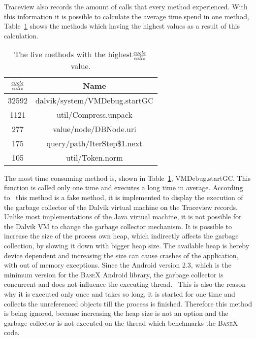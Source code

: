 Traceview also records the amount of calls that every method experienced.
With this information it is possible to calculate the average time spend in one method, Table~\ref{tab:tob-five-cycle-call} shows the methods which having the highest values as a result of this calculation.
\begin{table}[htpb]
	\centering
	\begin{tabular}{|c|c|}
		\hline
		${cycle \over calls}$&Name\\
		\hline
		32592&dalvik/system/VMDebug.startGC\\
		\hline
		1121&util/Compress.unpack\\
		\hline
		277&value/node/DBNode.uri\\
		\hline
		175&query/path/IterStep\$1.next\\
		\hline
		105&util/Token.norm\\
		\hline
	\end{tabular}
	\caption{The five methods with the highest${cycle \over calls}$ value.}
	\label{tab:tob-five-cycle-call}
\end{table}

The most time consuming method is, shown in Table~\ref{tab:tob-five-cycle-call}, \textsf{VMDebug.startGC}.
This function is called only one time and executes a long time in average.
According to~\cite{vmdebug-startgc} this method is a fake method, it is implemented to display the execution of the garbage collector of the Dalvik virtual machine on the Traceview records.
Unlike most implementations of the Java virtual machine, it is not possible for the Dalvik VM to change the garbage collector mechanism.
It is possible to increase the size of the process own heap, which indirectly affects the garbage collection, by slowing it down with bigger heap size.
The available heap is hereby device dependent and increasing the size can cause crashes of the application, with out of memory exceptions.
Since the Android version 2.3, which is the minimum version for the \textsc{BaseX} Android library, the garbage collector is concurrent and does not influence the executing thread.~\cite{dubroy2011memory}
This is also the reason why it is executed only once and takes so long, it is started for one time and collects the unreferenced objects till the process is finished.
Therefore this method is being ignored, because increasing the heap size is not an option and the garbage collector is not executed on the thread which benchmarks the \textsc{BaseX} code.

